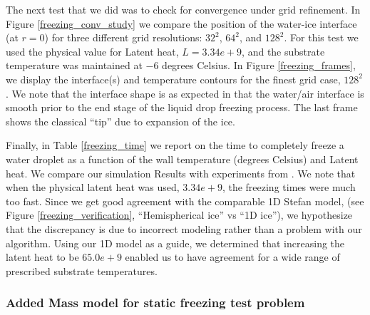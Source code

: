 \documentclass[]{article}
\begin{document}
The next test that we did was to check for convergence under grid 
refinement.  In Figure \ref{freezing_conv_study} we compare the
position of the water-ice interface (at $r=0$) for 
three different grid resolutions: $32^{2}$, $64^{2}$, and $128^{2}$.
For this test we used the physical value for Latent heat, $L=3.34e+9$,
and the substrate temperature was maintained at $-6$ degrees Celsius.
In Figure \ref{freezing_frames}, we display the interface(s) and 
temperature contours for the finest grid case, $128^{2}$.  We note that the 
interface shape is as expected in that the water/air interface is smooth
prior to the end stage of the liquid drop freezing process.
The last frame 
shows the classical ``tip'' due to expansion of the ice. 

Finally, in Table \ref{freezing_time} we report on the time
to completely freeze a water droplet as a 
function of the wall temperature (degrees Celsius)
and Latent heat.  We compare our simulation Results with
experiments from \cite{hu2010icing}.  
We note that when the physical latent heat was used, 
$3.34e+9$,
the freezing times were much too fast.  Since we get good agreement
with the comparable 1D Stefan model, 
(see Figure \ref{freezing_verification}, ``Hemispherical ice'' vs
``1D ice''), we hypothesize that the discrepancy is due to incorrect
modeling rather than a problem with our algorithm.  Using our 1D
model as a guide, we determined that increasing the latent heat
to be $65.0e+9$ enabled us to have agreement for a wide range of
prescribed substrate temperatures.


\subsubsection{Added Mass model for static freezing test problem 
\label{addmass_sec} }
\end{document}
